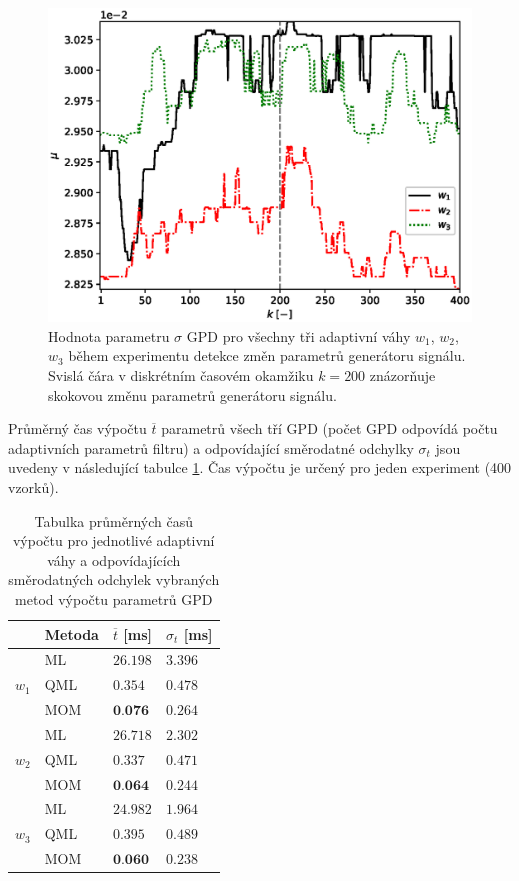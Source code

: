 \begin{figure}[h!]
	\label{fig:par_sigma}
	\centering
	\includegraphics[scale=0.71]{IMG/appel_par/par_mu.eps}
	\caption{Hodnota parametru $\sigma$ GPD pro všechny tři adaptivní váhy $w_1$, $w_2$, $w_3$ během experimentu detekce změn parametrů generátoru signálu. Svislá čára v diskrétním časovém okamžiku $k=200$ znázorňuje skokovou změnu parametrů generátoru signálu.}
\end{figure}
Průměrný čas výpočtu $\overline{t}$ parametrů všech tří GPD (počet GPD odpovídá počtu adaptivních parametrů filtru) a odpovídající směrodatné odchylky $\sigma_t$ jsou uvedeny v následující tabulce \ref{tab:par_results}. Čas výpočtu je určený pro jeden experiment (400 vzorků).
\begin{table}[h!]

\centering
\caption{Tabulka průměrných časů výpočtu pro jednotlivé adaptivní váhy a odpovídajících směrodatných odchylek vybraných metod výpočtu parametrů GPD}
\begin{tabular}{|l|l||l|l|}
\hline
 & Metoda & $\overline{t}$ {[}ms{]} & $\sigma_t$ {[}ms{]} \\ \hline \hline
\multirow{3}{*}{$w_1$} & ML & $26.198$ & $3.396$ \\ \cline{2-4} 
 & QML & $0.354$ & $0.478$ \\ \cline{2-4} 
 & MOM & $\textbf{0.076}$ & $0.264$ \\ \hline
\multirow{3}{*}{$w_2$} & ML & $26.718$ & $2.302$ \\ \cline{2-4} 
 & QML & $0.337$ & $0.471$ \\ \cline{2-4} 
 & MOM & $\textbf{0.064}$ & $0.244$ \\ \hline
\multirow{3}{*}{$w_3$} & ML & $24.982$ & $1.964$ \\ \cline{2-4} 
 & QML & $0.395$ & $0.489$ \\ \cline{2-4} 
 & MOM & $\textbf{0.060}$ & $0.238$ \\ \hline

\end{tabular}
 \label{tab:par_results}
\end{table}

